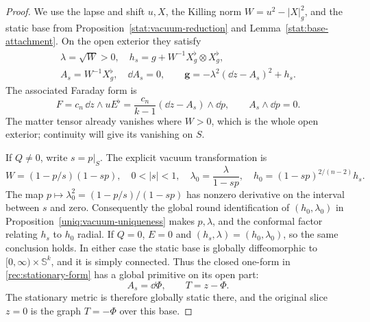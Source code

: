 \begin{proof}
We use the lapse and shift $u,X$, the Killing norm
$W=u^2-|X|_g^2$, and the static base from
Proposition~\ref{stat:vacuum-reduction} and
Lemma~\ref{stat:base-attachment}. On the open exterior they satisfy
\begin{equation}\label{rec:stationary-form}
\begin{gathered}
 \lambda=\sqrt W>0,\quad
 h_s=g+W^{-1}X_g^\flat\otimes X_g^\flat,\\
 A_s=W^{-1}X_g^\flat,\quad \dd A_s=0,
 \qquad
 \mathbf g=-\lambda^2(\dd z-A_s)^2+h_s.
\end{gathered}
\end{equation}
The associated Faraday form is
\begin{equation}\label{rec:stationary-faraday}
 F=c_n\,\dd z\wedge uE^\flat
   =\frac{c_n}{k-1}(\dd z-A_s)\wedge\dd p,
 \qquad A_s\wedge\dd p=0.
\end{equation}
The matter tensor already vanishes where $W>0$, which is the whole
open exterior; continuity will give its vanishing on $S$.

If $Q\ne0$, write $s=p|_S$. The explicit vacuum transformation is
\begin{equation}\label{rec:inverse-vacuum-transform}
 W=(1-p/s)(1-sp),\quad 0<|s|<1,\quad
 \lambda_0=\frac{\lambda}{1-sp},\quad
 h_0=(1-sp)^{2/(n-2)}h_s.
\end{equation}
The map $p\mapsto\lambda_0^2=(1-p/s)/(1-sp)$ has nonzero
derivative on the interval between $s$ and zero. Consequently the
global round identification of $(h_0,\lambda_0)$ in
Proposition~\ref{uniq:vacuum-uniqueness} makes $p,\lambda$, and
the conformal factor relating $h_s$ to $h_0$ radial. If $Q=0$,
$E=0$ and $(h_s,\lambda)=(h_0,\lambda_0)$, so the same conclusion
holds. In either case the static base is globally diffeomorphic to
$[0,\infty)\times\mathbb S^k$, and it is simply connected.
Thus the closed one-form in \eqref{rec:stationary-form} has a
global primitive on its open part:
\begin{equation}\label{rec:global-time}
 A_s=\dd\Phi,\qquad T=z-\Phi.
\end{equation}
The stationary metric is therefore globally static there, and the
original slice $z=0$ is the graph $T=-\Phi$ over this base.


\end{proof}
